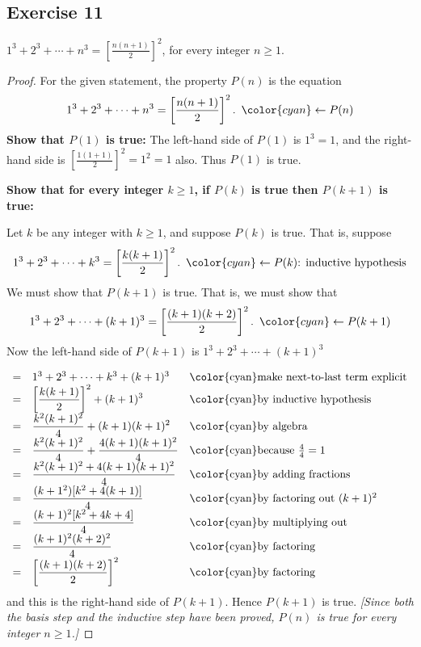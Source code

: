 \documentclass[14pt]{extarticle}
\newcommand{\dps}{\displaystyle}
\newcommand{\from}{\leftarrow}
\newcommand{\cy}{\color{cyan}}
\begin{document}
\subsection{Exercise 11}
$\dps 1^3 + 2^3 + \cdots + n^3 = \left[\frac{n(n+1)}{2}\right]^2$, for every integer $n \geq 1$.

\begin{proof}
    For the given statement, the property $P(n)$ is the equation
    \[
        \dps 1^3 + 2^3 + \cdots + n^3 = \left[\frac{n(n+1)}{2}\right]^2. \,\,\, {\cy \from P(n)}
    \]
    {\bf Show that $P(1)$ is true:} The left-hand side of $P(1)$ is $1^3 = 1$, and the right-hand side is $\dps \left[ \frac{1(1+1)}{2}\right]^2 = 1^2 = 1$ also. Thus $P(1)$ is true.

        {\bf Show that for every integer $k \geq 1$, if $P(k)$ is true then $P(k + 1)$ is true:}

    Let $k$ be any integer with $k \geq 1$, and suppose $P(k)$ is true. That is, suppose
    \[
        \dps 1^3 + 2^3 + \cdots + k^3 = \left[\frac{k(k+1)}{2}\right]^2. \,\,\, {\cy \from P(k) \text{: inductive hypothesis}}
    \]
    We must show that $P(k + 1)$ is true. That is, we must show that
    \[
        \dps 1^3 + 2^3 + \cdots + (k+1)^3 = \left[\frac{(k+1)(k+2)}{2}\right]^2. \,\,\,{\cy \from P(k+1)}
    \]
    Now the left-hand side of $P(k + 1)$ is $1^3 + 2^3 + \cdots + (k+1)^3$

    \[
        \begin{array}{lll}
            = & 1^3 + 2^3 + \cdots + k^3+ (k+1)^3                   & \text{\cy make next-to-last term explicit} \\
            = & \dps \left[\frac{k(k+1)}{2}\right]^2 + (k+1)^3      & \text{\cy by inductive hypothesis}         \\
            = & \dps \frac{k^2(k+1)^2}{4} + (k+1)(k+1)^2            & \text{\cy by algebra}                      \\
            = & \dps \frac{k^2(k+1)^2}{4} + \frac{4(k+1)(k+1)^2}{4} & \text{\cy because $\frac{4}{4} = 1$}       \\
            = & \dps \frac{k^2(k+1)^2 + 4(k+1)(k+1)^2}{4}           & \text{\cy by adding fractions}             \\
            = & \dps \frac{(k+1^2)[k^2 + 4(k+1)]}{4}                & \text{\cy by factoring out $(k+1)^2$}      \\
            = & \dps \frac{(k+1)^2[k^2+4k+4]}{4}                    & \text{\cy by multiplying out}              \\
            = & \dps \frac{(k+1)^2(k+2)^2}{4}                       & \text{\cy by factoring}                    \\
            = & \dps \left[\frac{(k+1)(k+2)}{2}\right]^2            & \text{\cy by factoring}
        \end{array}
    \]
    and this is the right-hand side of $P(k + 1)$. Hence $P(k + 1)$ is true. {\it [Since both the basis step and the inductive step have been proved, $P(n)$ is true for every integer $n \geq 1$.]}
\end{proof}
\end{document}
